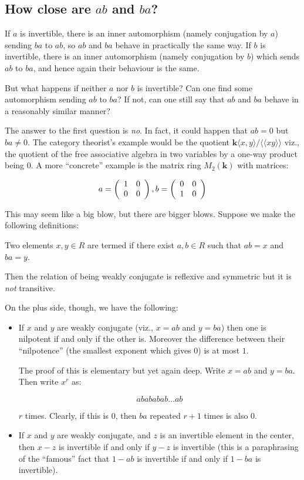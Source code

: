 \documentclass[a4paper]{amsart}
\newcommand{\field}{\mathbf{k}}
\begin{document}
\subsection{How close are $ab$ and $ba$?}

If $a$ is invertible, there is an inner automorphism (namely
conjugation by $a$) sending $ba$ to $ab$, so $ab$ and $ba$ behave in
practically the same way. If $b$ is invertible, there is an inner
automorphism (namely conjugation by $b$) which sends $ab$ to $ba$, and
hence again their behaviour is the same.

But what happens if neither $a$ nor $b$ is invertible? Can one find
some automorphism sending $ab$ to $ba$? If not, can one still say that
$ab$ and $ba$ behave in a reasonably similar manner?

The answer to the first question is {\em no}. In fact, it could happen
that $ab = 0$ but $ba \ne 0$. The category theorist's example would be
the quotient $\field\langle x,y \rangle/\langle \langle xy \rangle \rangle$ viz., the quotient of the free
associative algebra in two variables by a one-way product being $0$. A
more ``concrete'' example is the matrix ring $M_2(\field)$ with matrices:

$$a = \left(\begin{array}{rr} 1 & 0 \\ 0 & 0 \end{array}\right), b = \left(\begin{array}{rr} 0 & 0 \\ 1 & 0 \end{array}\right)$$

This may seem like a big blow, but there are bigger blows. Suppose we
make the following definitions:

\begin{definer}
  Two elements $x,y \in R$ are termed
   if there exist $a,b
  \in R$ such that $ab = x$ and $ba = y$.
\end{definer}

Then the relation of being weakly conjugate is reflexive and symmetric
but it is {\em not} transitive.

On the plus side, though, we have the following:

\begin{itemize}

\item If $x$ and $y$ are weakly conjugate (viz., $x = ab$ and $y = ba$)
  then one is nilpotent if and only if the other is. Moreover the
  difference between their ``nilpotence'' (the smallest exponent which
  gives $0$) is at most $1$.

  The proof of this is elementary but yet again deep. Write $x = ab$
  and $y = ba$. Then write $x^r$ as:

  $$abababab \ldots ab$$

  $r$ times. Clearly, if this is $0$, then $ba$ repeated $r + 1$ times
  is also $0$.

\item If $x$ and $y$ are weakly conjugate, and $z$ is an invertible
  element in the center, then $x - z$ is invertible if and only if $y
  - z$ is invertible (this is a paraphrasing of the ``famous'' fact
  that $1 - ab$ is invertible if and only if $1 - ba$ is invertible).

\end{itemize}
\end{document}
